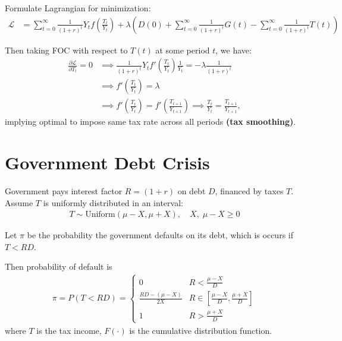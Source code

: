 \documentclass[main.tex]{subfiles}
\begin{document}
        Formulate Lagrangian for minimization:
        \begin{align}
            \mathcal{L}
            &= \sum_{t=0}^\infty
            \frac{1}{(1+r)^t}
            Y_t f\left(\frac{T_t}{Y_t}\right)
            + \lambda \left(
            D(0) + \sum_{t=0}^\infty \frac{1}{(1+r)^t} G(t)
            - \sum_{t=0}^\infty \frac{1}{(1+r)^t} T(t)
            \right)
        \end{align}
        
        Then taking FOC with respect to $T(t)$ at some period $t$, we have:
        \begin{align}
            \frac{\partial \mathcal{L}}{\partial T_t}
            = 0
            &\implies
            \frac{1}{(1+r)^t}
            Y_t f'\left(\frac{T_t}{Y_t}\right) \frac{1}{Y_t} = - \lambda \frac{1}{(1+r)^t}
            \\
            &\implies
            f'\left(\frac{T_t}{Y_t}\right)
            = \lambda
            \\
            &\implies
            f'\left(\frac{T_t}{Y_t}\right)
            = f'\left(\frac{T_{t+1}}{Y_{t+1}}\right)
            \implies
            \frac{T_t}{Y_t} = \frac{T_{t+1}}{Y_{t+1}},
        \end{align}
        implying optimal to impose same tax rate across all periods \textbf{(tax smoothing)}. 
    
    
    \section{Government Debt Crisis}
        
        Government pays interest factor $R = (1+r)$ on debt $D$, financed by taxes $T$. Assume $T$ is uniformly distributed in an interval:
        \begin{align}
            T \sim \text{Uniform}\left(\mu - X, \mu + X\right), \quad X, \; \mu - X \ge 0
        \end{align}
        
        Let $\pi$ be the probability the government defaults on its debt, which is occurs if $T < RD$.
        
        Then probability of default is
        \begin{align}
            \pi = P(T < RD)
            = \begin{cases}
                0
                & R < \frac{\mu-X}{D}
                \\
                \frac{RD - (\mu - X)}{2X}
                & R \in \left[
                    \frac{\mu-X}{D}, \frac{\mu+X}{D}
                    \right]
                \\
                1
                & R > \frac{\mu + X}{D}
            \end{cases}
            \label{eqn:tax-cdf}
        \end{align}
        where $T$ is the tax income, $F(\cdot)$ is the cumulative distribution function. \\
        
\end{document}

